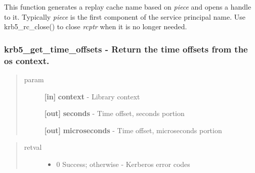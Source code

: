 \documentclass[letterpaper,10pt,english]{sphinxmanual}
\begin{document}
This function generates a replay cache name based on \emph{piece} and opens a handle to it. Typically \emph{piece} is the first component of the service principal name. Use krb5\_rc\_close() to close \emph{rcptr} when it is no longer needed.


\subsubsection{krb5\_get\_time\_offsets -  Return the time offsets from the os context.}
\label{appdev/refs/api/krb5_get_time_offsets:krb5-get-time-offsets-return-the-time-offsets-from-the-os-context}\label{appdev/refs/api/krb5_get_time_offsets::doc}

\begin{fulllineitems}
\label{appdev/refs/api/krb5_get_time_offsets:krb5_get_time_offsets}
\end{fulllineitems}

\begin{quote}\begin{description}
\item[{param}] \leavevmode
\textbf{{[}in{]}} \textbf{context} - Library context

\textbf{{[}out{]}} \textbf{seconds} - Time offset, seconds portion

\textbf{{[}out{]}} \textbf{microseconds} - Time offset, microseconds portion

\end{description}\end{quote}
\begin{quote}\begin{description}
\item[{retval}] \leavevmode\begin{itemize}
\item {} 
0   Success; otherwise - Kerberos error codes

\end{itemize}

\end{description}\end{quote}
\end{document}
